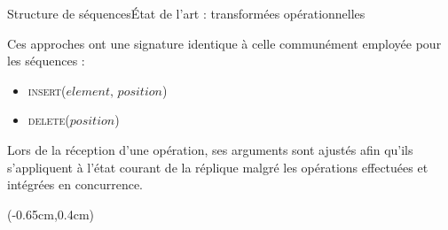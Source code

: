 \begin{frame}{Structure de séquences}{État de l'art : transformées opérationnelles}

  \vspace{-1.5cm}

  Ces approches \REF{} ont une signature identique à celle communément employée
  pour les séquences : 
  \begin{itemize}
  \item \textsc{insert}($element,\,position$)
  \item \textsc{delete}($position$)
  \end{itemize}

  \vspace{0.5cm}

  Lors de la réception d'une opération, ses arguments sont ajustés afin qu'ils
  s'appliquent à l'état courant de la réplique malgré les opérations effectuées
  et intégrées en concurrence. 


  \begin{textblock*}{\textwidth}(-0.65cm,0.4cm) 
    
  \end{textblock*}



\end{frame}

